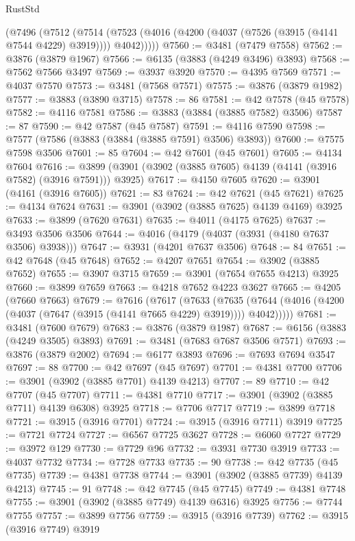 \begin{lexlean}{RustStd}
\begin{coremodule}
    (@7496
      (@7512
        (@7514 (@7523 (@4016 (@4200 (@4037 (@7526 (@3915 (@4141 @7544 @4229) @3919)))) @4042)))))
@7560 := @3481 (@7479 @7558)
@7562 := @3876 (@3879 @1967)
@7566 := @6135 (@3883 (@4249 @3496) @3893)
@7568 := @7562 @7566 @3497
@7569 := @3937 @3920
@7570 := @4395 @7569
@7571 := @4037 @7570
@7573 := @3481 (@7568 @7571)
@7575 := @3876 (@3879 @1982)
@7577 := @3883 (@3890 @3715)
@7578 := 86
@7581 := @42 @7578 (@45 @7578)
@7582 := @4116 @7581
@7586 := @3883 (@3884 (@3885 @7582) @3506)
@7587 := 87
@7590 := @42 @7587 (@45 @7587)
@7591 := @4116 @7590
@7598 := @7577 (@7586 (@3883 (@3884 (@3885 @7591) @3506) @3893))
@7600 := @7575 @7598 @3506
@7601 := 85
@7604 := @42 @7601 (@45 @7601)
@7605 := @4134 @7604
@7616 := @3899 (@3901 (@3902 (@3885 @7605) @4139 (@4141 (@3916 @7582) (@3916 @7591))) @3925)
@7617 := @4150 @7605
@7620 := @3901 (@4161 (@3916 @7605))
@7621 := 83
@7624 := @42 @7621 (@45 @7621)
@7625 := @4134 @7624
@7631 := @3901 (@3902 (@3885 @7625) @4139 @4169) @3925
@7633 := @3899 (@7620 @7631)
@7635 := @4011 (@4175 @7625)
@7637 := @3493 @3506 @3506
@7644 := @4016 (@4179 (@4037 (@3931 (@4180 @7637 @3506) @3938)))
@7647 := @3931 (@4201 @7637 @3506)
@7648 := 84
@7651 := @42 @7648 (@45 @7648)
@7652 := @4207 @7651
@7654 := @3902 (@3885 @7652)
@7655 := @3907 @3715
@7659 := @3901 (@7654 @7655 @4213) @3925
@7660 := @3899 @7659
@7663 := @4218 @7652 @4223 @3627
@7665 := @4205 (@7660 @7663)
@7679 := @7616
    (@7617
      (@7633
        (@7635 (@7644 (@4016 (@4200 (@4037 (@7647 (@3915 (@4141 @7665 @4229) @3919)))) @4042)))))
@7681 := @3481 (@7600 @7679)
@7683 := @3876 (@3879 @1987)
@7687 := @6156 (@3883 (@4249 @3505) @3893)
@7691 := @3481 (@7683 @7687 @3506 @7571)
@7693 := @3876 (@3879 @2002)
@7694 := @6177 @3893
@7696 := @7693 @7694 @3547
@7697 := 88
@7700 := @42 @7697 (@45 @7697)
@7701 := @4381 @7700
@7706 := @3901 (@3902 (@3885 @7701) @4139 @4213)
@7707 := 89
@7710 := @42 @7707 (@45 @7707)
@7711 := @4381 @7710
@7717 := @3901 (@3902 (@3885 @7711) @4139 @6308) @3925
@7718 := @7706 @7717
@7719 := @3899 @7718
@7721 := @3915 (@3916 @7701)
@7724 := @3915 (@3916 @7711) @3919
@7725 := @7721 @7724
@7727 := @6567 @7725 @3627
@7728 := @6060 @7727
@7729 := @3972 @129
@7730 := @7729 @96
@7732 := @3931 @7730 @3919
@7733 := @4037 @7732
@7734 := @7728 @7733
@7735 := 90
@7738 := @42 @7735 (@45 @7735)
@7739 := @4381 @7738
@7744 := @3901 (@3902 (@3885 @7739) @4139 @4213)
@7745 := 91
@7748 := @42 @7745 (@45 @7745)
@7749 := @4381 @7748
@7755 := @3901 (@3902 (@3885 @7749) @4139 @6316) @3925
@7756 := @7744 @7755
@7757 := @3899 @7756
@7759 := @3915 (@3916 @7739)
@7762 := @3915 (@3916 @7749) @3919

\end{coremodule}
\end{lexlean}
